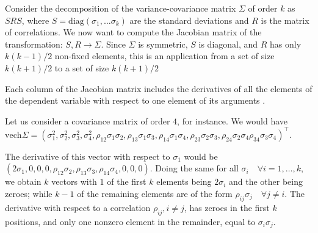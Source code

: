 \documentclass{article}
\begin{document}
Consider the decomposition of the variance-covariance matrix $\Sigma$ of order $k$ as $SRS$, where $S = \mathrm{diag}(\sigma_1, \dots \sigma_k)$ are the standard deviations and $R$ is the matrix of correlations. We now want to compute the Jacobian matrix of the transformation: $S, R \rightarrow \Sigma$. 
Since $\Sigma$ is symmetric, $S$ is diagonal, and $R$ has only $k(k-1)/2$ non-fixed elements, this is an application from a set of size $k(k+1)/2$ to a set of size $k(k+1)/2$

Each column of the Jacobian matrix includes the derivatives of all the elements of the dependent variable with respect to one element of its arguments \cite{Magnus}. 

Let us consider a covariance matrix of order $4$, for instance. We would have $\mathrm{vech} \Sigma = (\sigma_1^2, \sigma_2^2, \sigma_3^2, \sigma_4^2, \rho_{12} \sigma_1 \sigma_2 , \rho_{13} \sigma_1 \sigma_3, \rho_{14} \sigma_1 \sigma_4, \rho_{23} \sigma_2 \sigma_3, \rho_{24} \sigma_2 \sigma_4 \rho_{34} \sigma_3 \sigma_4   )^\top$. 

The derivative of this vector with respect to $\sigma_1$ would be $(2 \sigma_1, 0,0,0, \rho_{12} \sigma_2, \rho_{13} \sigma_3, \rho_{14} \sigma_4, 0, 0, 0)$. Doing the same for all $\sigma_i \quad \forall i = 1, \dots, k$, we obtain $k$ vectors with $1$ of the first $k$ elements being $2 \sigma_i$ and the other being zeroes; while $k-1$ of the remaining elements are of the form $\rho_{ij} \sigma_j \quad \forall j \neq i$. 
The derivative with respect to a correlation $\rho_{ij}, i \neq j$, has zeroes in the first $k$ positions, and only one nonzero element in the remainder, equal to $\sigma_i \sigma_j$. 
\end{document}
